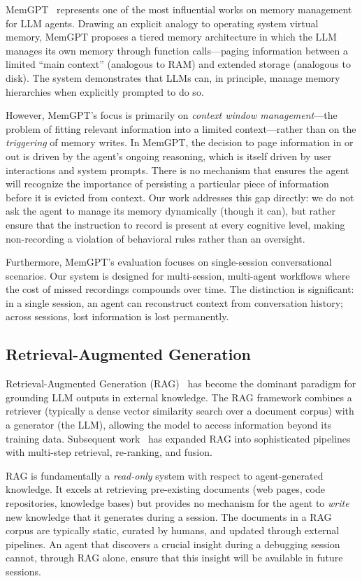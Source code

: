 \documentclass[11pt]{article}
\begin{document}
MemGPT~\cite{packer2023memgpt} represents one of the most influential works on memory management for LLM agents. Drawing an explicit analogy to operating system virtual memory, MemGPT proposes a tiered memory architecture in which the LLM manages its own memory through function calls---paging information between a limited ``main context'' (analogous to RAM) and extended storage (analogous to disk). The system demonstrates that LLMs can, in principle, manage memory hierarchies when explicitly prompted to do so.

However, MemGPT's focus is primarily on \emph{context window management}---the problem of fitting relevant information into a limited context---rather than on the \emph{triggering} of memory writes. In MemGPT, the decision to page information in or out is driven by the agent's ongoing reasoning, which is itself driven by user interactions and system prompts. There is no mechanism that ensures the agent will recognize the importance of persisting a particular piece of information before it is evicted from context. Our work addresses this gap directly: we do not ask the agent to manage its memory dynamically (though it can), but rather ensure that the instruction to record is present at every cognitive level, making non-recording a violation of behavioral rules rather than an oversight.

Furthermore, MemGPT's evaluation focuses on single-session conversational scenarios. Our system is designed for multi-session, multi-agent workflows where the cost of missed recordings compounds over time. The distinction is significant: in a single session, an agent can reconstruct context from conversation history; across sessions, lost information is lost permanently.

\subsection{Retrieval-Augmented Generation}

Retrieval-Augmented Generation (RAG)~\cite{lewis2020rag} has become the dominant paradigm for grounding LLM outputs in external knowledge. The RAG framework combines a retriever (typically a dense vector similarity search over a document corpus) with a generator (the LLM), allowing the model to access information beyond its training data. Subsequent work~\cite{gao2024rag} has expanded RAG into sophisticated pipelines with multi-step retrieval, re-ranking, and fusion.

RAG is fundamentally a \emph{read-only} system with respect to agent-generated knowledge. It excels at retrieving pre-existing documents (web pages, code repositories, knowledge bases) but provides no mechanism for the agent to \emph{write} new knowledge that it generates during a session. The documents in a RAG corpus are typically static, curated by humans, and updated through external pipelines. An agent that discovers a crucial insight during a debugging session cannot, through RAG alone, ensure that this insight will be available in future sessions.
\end{document}
